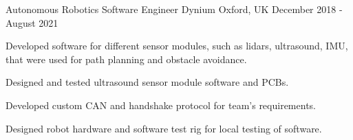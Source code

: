 \begin{cventries}
    \newline
  \cventry
    {Autonomous Robotics Software Engineer} %
    {Dynium} %
    {Oxford, UK} %
    {December 2018 - August 2021} %
    {
      \begin{cvitems} %
        \item {Developed software for different sensor modules, such as lidars, ultrasound, IMU, that were used for path planning and obstacle avoidance.}
        \item {Designed and tested ultrasound sensor module software and PCBs.}
        \item {Developed custom CAN and handshake protocol for team’s requirements.}
        \item {Designed robot hardware and software test rig for local testing of software.}
      \end{cvitems}
    }
\end{cventries}
